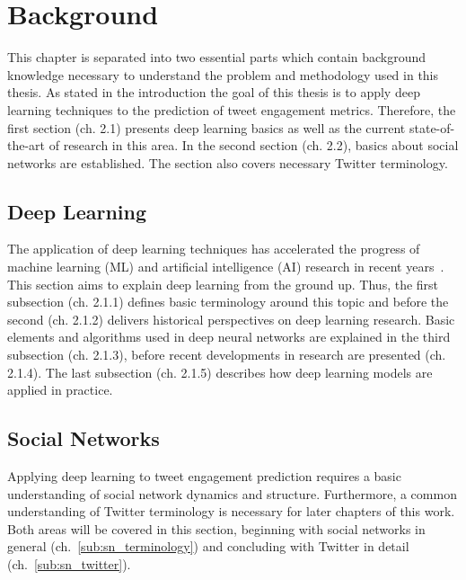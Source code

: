 \section{Background}

This chapter is separated into two essential parts which contain background
knowledge necessary to understand the problem and methodology used in this 
thesis. As stated in the introduction the goal of this thesis is to apply deep
learning techniques to the prediction of tweet engagement metrics. Therefore,
the first section (ch. 2.1) presents deep learning basics as well as the current
state-of-the-art of research in this area. In the second section (ch. 2.2), 
basics about social networks are established. The section also covers necessary 
Twitter terminology.

\subsection{Deep Learning}
\label{sec:deep_learning}

The application of deep learning techniques has accelerated the progress of 
machine learning (ML) and artificial intelligence (AI) research in recent years~\cite{Brynjolfsson2017}. 
This section aims to explain deep learning from the ground up. Thus, the 
first subsection (ch. 2.1.1) defines basic terminology around this topic 
and before the second (ch. 2.1.2) delivers historical perspectives on deep learning research. 
Basic elements and algorithms used in deep neural networks are explained in the third 
subsection (ch. 2.1.3), before recent developments in research are
presented (ch. 2.1.4). The last subsection (ch. 2.1.5) describes how
deep learning models are applied in practice.











\subsection{Social Networks}
\label{sec:social_networks}

Applying deep learning to tweet engagement prediction requires a basic
understanding of social network dynamics and structure. Furthermore, a common
understanding of Twitter terminology is necessary for later chapters of this
work. Both areas will be covered in this section, beginning with social
networks in general (ch.~\ref{sub:sn_terminology}) and concluding with
Twitter in detail (ch.~\ref{sub:sn_twitter}).




